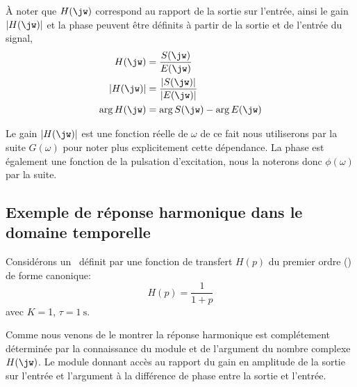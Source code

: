 \`A noter que $H(\jw)$ correspond au rapport de la sortie sur l'entrée,
ainsi le gain $|H(\jw)|$ et la phase peuvent être définits à partir de la sortie et de l'entrée du signal,
\begin{align*}
    H(\jw) &= \dfrac{S(\jw)}{E(\jw)} \\
    |H(\jw)|&= \dfrac{|S(\jw)|}{|E(\jw)|} \\
    \arg{H(\jw)}&=\arg{S(\jw)}-\arg{E(\jw)}
\end{align*}

Le gain $|H(\jw)|$ est une fonction réelle de $\omega$ de ce fait nous utiliserons par la suite
$G(\omega)$ pour noter plus explicitement cette dépendance. La phase est également
une fonction de la pulsation d'excitation, nous la noterons donc $\phi(\omega)$ par la suite.


\subsection{Exemple de réponse harmonique dans le domaine temporelle}
Considérons un \SLCI~définit par une fonction de transfert $H(p)$ du premier ordre () de forme canonique:
$$
H(p)=\dfrac{1}{1+p}
$$
avec $K=$1, $\tau=\SI{1}{\second}$.

Comme nous venons de le montrer la réponse harmonique est complétement 
déterminée par la connaissance du module et de l'argument du nombre complexe $H(\jw)$.
Le module donnant accès au rapport du gain en amplitude de la sortie sur l'entrée et 
l'argument à la différence de phase entre la sortie et l'entrée.

